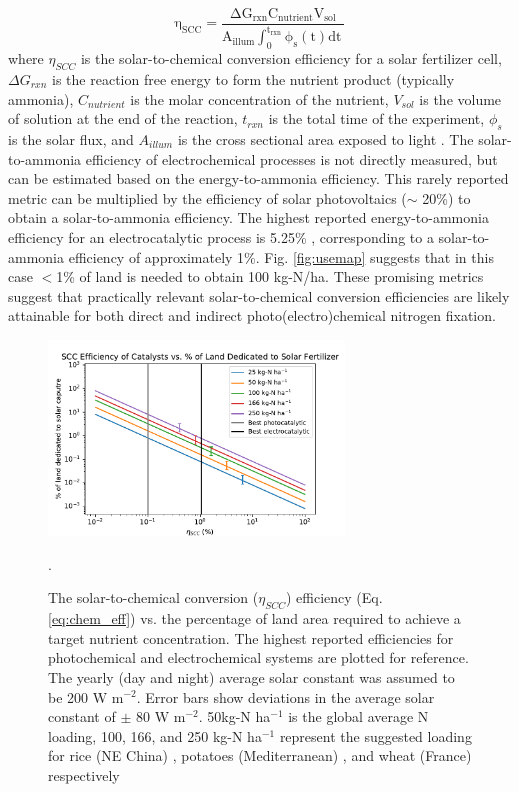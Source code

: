 \begin{equation}
\label{eq:chem_eff}
\mathrm{
\eta_{SCC} = \frac{\Delta G_{rxn}C_{nutrient}V_{sol}}{A_{illum} \int_{0}^{t_{rxn}}\phi_s(t) dt \: }
}
\end{equation}
where $\eta_{SCC}$ is the solar-to-chemical conversion efficiency for a solar fertilizer cell, $\Delta G_{rxn}$ is the reaction free energy to form the nutrient product (typically ammonia), $C_{nutrient}$ is the molar concentration of the nutrient, $V_{sol}$ is the volume of solution at the end of the reaction, $t_{rxn}$ is the total time of the experiment, $\phi_s$ is the solar flux, and $A_{illum}$ is the cross sectional area exposed to light \cite{Chen_2010}. The solar-to-ammonia efficiency of electrochemical processes is not directly measured, but can be estimated based on the energy-to-ammonia efficiency. This rarely reported metric can be multiplied by the efficiency of solar photovoltaics ($\sim$ 20\%) to obtain a solar-to-ammonia efficiency. The highest reported energy-to-ammonia efficiency for an electrocatalytic process is 5.25\% \cite{Song_2018}, corresponding to a solar-to-ammonia efficiency of approximately 1\%. Fig. \ref{fig:usemap} suggests that in this case $<$1\% of land is needed to obtain 100 kg-N/ha. These promising metrics suggest that practically relevant solar-to-chemical conversion efficiencies are likely attainable for both direct and indirect photo(electro)chemical nitrogen fixation.


\begin{figure}
    \centering
    \includegraphics[width=0.7\textwidth]{Figures/footprint.pdf}
    \caption{The solar-to-chemical conversion ($\eta_{SCC}$) efficiency (Eq. \ref{eq:chem_eff}) vs. the percentage of land area required to achieve a target nutrient concentration. The highest reported efficiencies for photochemical \cite{Shiraishi_2018} and electrochemical \cite{Song_2018} systems are plotted for reference. The yearly (day and night) average solar constant was assumed to be 200 W m$^{-2}$. Error bars show deviations in the average solar constant of $\pm$ 80 W m$^{-2}$. 50kg-N ha$^{-1}$ is the global average N loading, 100, 166, and 250 kg-N ha$^{-1}$ represent the suggested loading for rice (NE China) \cite{HUANG_2018}, potatoes (Mediterranean) \cite{Waller_2016}, and wheat (France) respectively \cite{Stockle_1997}}.
    \label{fig:eff_footprint}
\end{figure}

